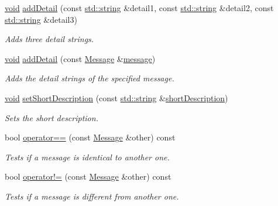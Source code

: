 \begin{DoxyCompactItemize}
\hyperlink{wglew_8h_aeea6e3dfae3acf232096f57d2d57f084}{void} \hyperlink{class_message_a9d83e2c5fd0d817291331e65830b824a}{add\-Detail} (const \hyperlink{glew_8h_ae84541b4f3d8e1ea24ec0f466a8c568b}{std\-::string} \&detail1, const \hyperlink{glew_8h_ae84541b4f3d8e1ea24ec0f466a8c568b}{std\-::string} \&detail2, const \hyperlink{glew_8h_ae84541b4f3d8e1ea24ec0f466a8c568b}{std\-::string} \&detail3)
\begin{DoxyCompactList}\small\item\em Adds three detail strings. \end{DoxyCompactList}\item 
\hyperlink{wglew_8h_aeea6e3dfae3acf232096f57d2d57f084}{void} \hyperlink{class_message_a576d9d2c563c11ff0a000d22bb235d1c}{add\-Detail} (const \hyperlink{class_message}{Message} \&\hyperlink{glew_8h_a76333d9470ffdd4811326932394d36da}{message})
\begin{DoxyCompactList}\small\item\em Adds the detail strings of the specified message. \end{DoxyCompactList}\item 
\hyperlink{wglew_8h_aeea6e3dfae3acf232096f57d2d57f084}{void} \hyperlink{class_message_a3f2362cf70c38b79a188dd8545d24d03}{set\-Short\-Description} (const \hyperlink{glew_8h_ae84541b4f3d8e1ea24ec0f466a8c568b}{std\-::string} \&\hyperlink{class_message_aa22497c35079e8619c516f693d1fd97f}{short\-Description})
\begin{DoxyCompactList}\small\item\em Sets the short description. \end{DoxyCompactList}\item 
bool \hyperlink{class_message_a30387c914e7f0125a38f2819b9f43e04}{operator==} (const \hyperlink{class_message}{Message} \&other) const 
\begin{DoxyCompactList}\small\item\em Tests if a message is identical to another one. \end{DoxyCompactList}\item 
bool \hyperlink{class_message_a5abc9c637b0c4ec2b7966ea06bd1401b}{operator!=} (const \hyperlink{class_message}{Message} \&other) const 
\begin{DoxyCompactList}\small\item\em Tests if a message is different from another one. \end{DoxyCompactList}\end{DoxyCompactItemize}


